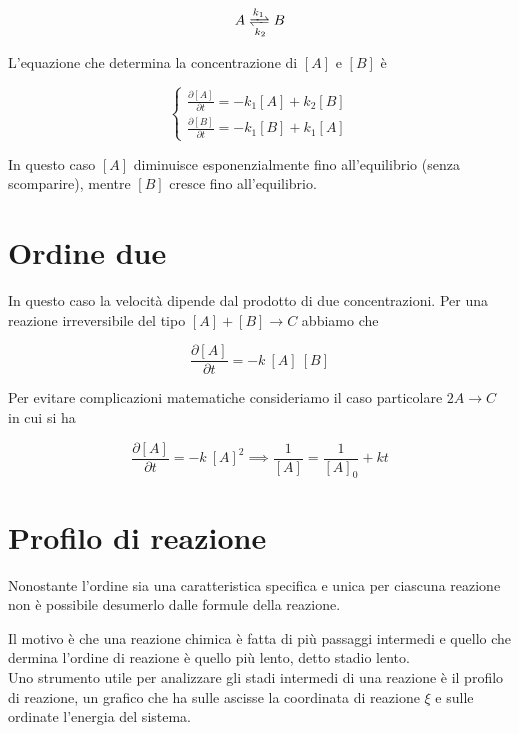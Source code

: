 \begin{equation}
    A \xrightleftharpoons[k_2]{k_1} B
\end{equation}

L'equazione che determina la concentrazione di $[A]$ e $[B]$ è 

\begin{equation}
    \left\{\begin{array}{l}
        \frac{\partial[A]}{\partial t}=-k_1[A]+k_2[B] \\
        \frac{\partial[B]}{\partial t}=-k_1[B]+k_1[A]
    \end{array}\right.
\end{equation}

In questo caso $[A]$ diminuisce esponenzialmente fino all'equilibrio (senza scomparire), mentre $[B]$ cresce fino all'equilibrio. 

\section{Ordine due}

In questo caso la velocità dipende dal prodotto di due concentrazioni. Per una reazione irreversibile del tipo $[A] + [B] \to C$ abbiamo che

\begin{equation}
    \frac{\partial [A]}{\partial t} = - k \ [A] \ [B]
\end{equation}

Per evitare complicazioni matematiche consideriamo il caso particolare $2A \to C$ in cui si ha 

\begin{equation}
    \frac{\partial [A]}{\partial t} = - k \ [A]^2 \implies \frac{1}{[A]} = \frac{1}{[A]_0} + kt
\end{equation}

\section{Profilo di reazione}

Nonostante l'ordine sia una caratteristica specifica e unica per ciascuna reazione non è possibile desumerlo dalle formule della reazione. 

Il motivo è che una reazione chimica è fatta di più passaggi intermedi e quello che dermina l'ordine di reazione è quello più lento, detto stadio lento. \\

Uno strumento utile per analizzare gli stadi intermedi di una reazione è il profilo di reazione, un grafico che ha sulle ascisse la coordinata di reazione $\xi$ e sulle ordinate l'energia del sistema. 

